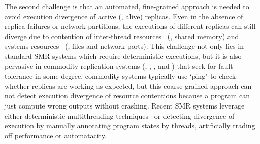 The second challenge is that an automated, fine-grained approach is needed to 
avoid execution divergence of active (\ie, alive) replicas. Even in the absence 
of replica failures or network partitions, the executions of different replicas 
can still diverge due to contention of 
inter-thread resources~\cite{coredet:asplos10} (\eg, shared memory) and systems 
resources~\cite{racepro:sosp11} (\eg, files and network ports). This challenge 
not only lies in standard SMR systems which require deterministic executions, 
but it is also pervasive in commodity replication systems (\eg, \redis, 
\memcached, and \mysql) that seek for fault-tolerance in some degree. commodity 
systems typically use `ping" to check whether replicas are working as expected, 
but this coarse-grained approach can not detect execution divergence of 
resource contentions because a program can just compute wrong outputs without 
crashing. Recent SMR systems leverage either deterministic multithreading 
techniques~\cite{rex:eurosys14,crane:sosp15} or detecting divergence of 
execution by manually annotating program states by threads, artificially 
trading off performance or automatacity.










